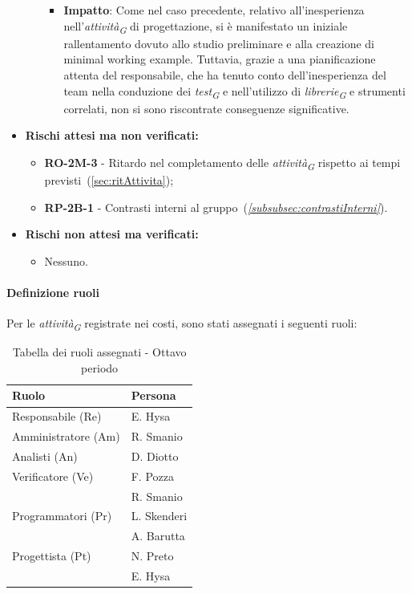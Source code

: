 \begin{itemize}
\begin{itemize}
\begin{itemize}
            \item \textbf{Impatto}: Come nel caso precedente, relativo all'inesperienza nell'\textit{attività}\textsubscript{\textit{G}} di progettazione, si è manifestato un iniziale rallentamento dovuto allo studio preliminare e alla creazione di minimal working example. Tuttavia, grazie a una pianificazione attenta del responsabile, che ha tenuto conto dell'inesperienza del team nella conduzione dei \textit{test}\textsubscript{\textit{G}} e nell'utilizzo di \textit{librerie}\textsubscript{\textit{G}} e strumenti correlati, non si sono riscontrate conseguenze significative.
        \end{itemize}
\end{itemize}
\item \textbf{Rischi attesi ma non verificati:}
 \begin{itemize}
    \item \textbf{RO-2M-3} - Ritardo nel completamento delle \textit{attività}\textsubscript{\textit{G}} rispetto ai tempi previsti~(\ref{sec:ritAttivita});
    \item \textbf{RP-2B-1} - Contrasti interni al gruppo~(\textit{\ref{subsubsec:contrastiInterni}}).
\end{itemize}
\item \textbf{Rischi non attesi ma verificati:}
\begin{itemize}
    \item Nessuno.
\end{itemize}
\end{itemize}

\paragraph{Definizione ruoli}
Per le \textit{attività}\textsubscript{\textit{G}} registrate nei costi, sono stati assegnati i seguenti ruoli: 

\begin{table}[H]
    \centering
    \begin{tabular}{|L{4cm}|L{2cm}|}
        \hline
        \textbf{Ruolo} & \textbf{Persona} \\
        \hline
        \hline
        Responsabile (Re)   & E. Hysa \\
        \hline
        Amministratore (Am) & R. Smanio \\
        \hline
        Analisti (An)       & D. Diotto \\
        \hline
        Verificatore (Ve)   & F. Pozza \\
                            & R. Smanio \\   
        \hline
        Programmatori (Pr)  & L. Skenderi \\
                            & A. Barutta \\
        \hline
        Progettista (Pt)    & N. Preto \\
                            & E. Hysa \\
        \hline
    \end{tabular}
    \caption{Tabella dei ruoli assegnati - Ottavo periodo}
    \label{tab:Ruoli_persone_8}
\end{table}


